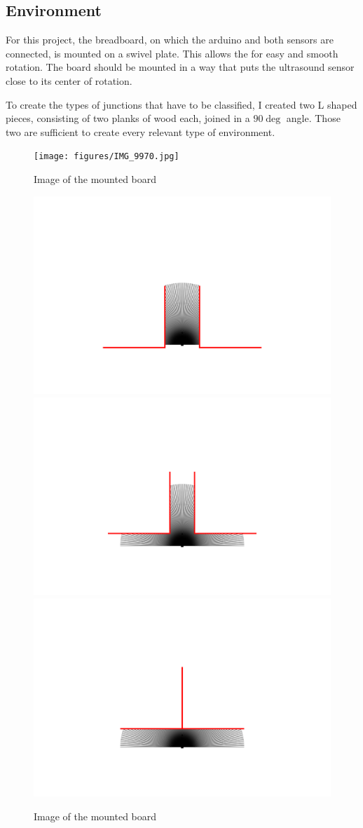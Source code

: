 \subsection{Environment}
\label{subsec:environment}

For this project, the breadboard, on which the arduino and both sensors are connected, is mounted on a swivel plate.
This allows the for easy and smooth rotation.
The board should be mounted in a way that puts the ultrasound sensor close to its center of rotation.

To create the types of junctions that have to be classified, I created two L shaped pieces, consisting of two planks of wood each, joined in a $90\deg$ angle.
Those two are sufficient to create every relevant type of environment.

\begin{figure}
    \centering
    \texttt{[image: figures/IMG\_9970.jpg]}
    \caption{Image of the mounted board}

    \label{fig:setup}
\end{figure}


\begin{figure}
    \centering
    \includegraphics[width=0.3\linewidth]{figures/c.svg}
    \includegraphics[width=0.3\linewidth]{figures/x.svg}
    \includegraphics[width=0.3\linewidth]{figures/t.svg}

    \caption{Image of the mounted board}

    \label{fig:env}
\end{figure}